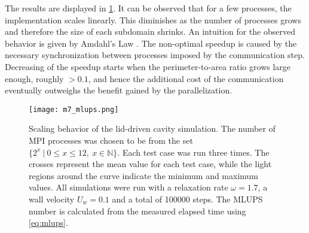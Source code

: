 The results are displayed in \cref{fig:lid:scaling}. It can be observed that for a few processes, the implementation scales linearly. This diminishes as the number of processes grows and therefore the size of each subdomain shrinks. An intuition for the observed behavior is given by Amdahl's Law \cite{amdahl}. The non-optimal speedup is caused by the necessary synchronization between processes imposed by the communication step. Decreasing of the speedup starts when the perimeter-to-area ratio grows large enough, roughly $>0.1$, and hence the additional cost of the communication eventually outweighs the benefit gained by the parallelization.

\begin{figure}[ht!]
    \centering
    \texttt{[image: m7\_mlups.png]}
    \caption[Scaling behavior of the lid-driven cavity simulation]{Scaling behavior of the lid-driven cavity simulation. The number of MPI processes was chosen to be from the set $\{2^x~|~0 \le x \le 12,~ x \in \mathbb{N}\}$. Each test case was run three times. The crosses represent the mean value for each test case, while the light regions around the curve indicate the minimum and maximum values. All simulations were run with a relaxation rate $\omega=1.7$, a wall velocity $U_w=0.1$ and a total of 100000 steps. The \gls{MLUPS} number is calculated from the measured elapsed time using \cref{eq:mlups}.}
    \label{fig:lid:scaling}
\end{figure}
